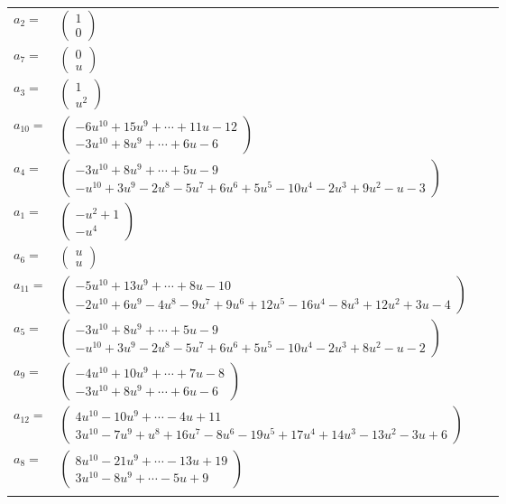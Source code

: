 \documentclass[1p]{elsarticle_modified}
\theoremstyle{definition}
\begin{document}
\begin{tabular}{m{7pt} m{180pt} m{7pt} m{180pt} }
\flushright $a_{2}=$&$\begin{pmatrix}1\\0\end{pmatrix}$ \\
\flushright $a_{7}=$&$\begin{pmatrix}0\\u\end{pmatrix}$ \\
\flushright $a_{3}=$&$\begin{pmatrix}1\\u^2\end{pmatrix}$ \\
\flushright $a_{10}=$&$\begin{pmatrix}-6 u^{10}+15 u^9+\cdots+11 u-12\\-3 u^{10}+8 u^9+\cdots+6 u-6\end{pmatrix}$ \\
\flushright $a_{4}=$&$\begin{pmatrix}-3 u^{10}+8 u^9+\cdots+5 u-9\\- u^{10}+3 u^9-2 u^8-5 u^7+6 u^6+5 u^5-10 u^4-2 u^3+9 u^2- u-3\end{pmatrix}$ \\
\flushright $a_{1}=$&$\begin{pmatrix}- u^2+1\\- u^4\end{pmatrix}$ \\
\flushright $a_{6}=$&$\begin{pmatrix}u\\u\end{pmatrix}$ \\
\flushright $a_{11}=$&$\begin{pmatrix}-5 u^{10}+13 u^9+\cdots+8 u-10\\-2 u^{10}+6 u^9-4 u^8-9 u^7+9 u^6+12 u^5-16 u^4-8 u^3+12 u^2+3 u-4\end{pmatrix}$ \\
\flushright $a_{5}=$&$\begin{pmatrix}-3 u^{10}+8 u^9+\cdots+5 u-9\\- u^{10}+3 u^9-2 u^8-5 u^7+6 u^6+5 u^5-10 u^4-2 u^3+8 u^2- u-2\end{pmatrix}$ \\
\flushright $a_{9}=$&$\begin{pmatrix}-4 u^{10}+10 u^9+\cdots+7 u-8\\-3 u^{10}+8 u^9+\cdots+6 u-6\end{pmatrix}$ \\
\flushright $a_{12}=$&$\begin{pmatrix}4 u^{10}-10 u^9+\cdots-4 u+11\\3 u^{10}-7 u^9+u^8+16 u^7-8 u^6-19 u^5+17 u^4+14 u^3-13 u^2-3 u+6\end{pmatrix}$ \\
\flushright $a_{8}=$&$\begin{pmatrix}8 u^{10}-21 u^9+\cdots-13 u+19\\3 u^{10}-8 u^9+\cdots-5 u+9\end{pmatrix}$\\&\end{tabular}
\end{document}
